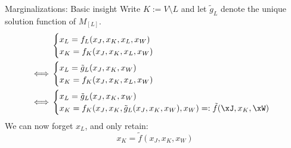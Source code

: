 \begin{frame}{Marginalizations: Basic insight}
  Write $K := V \setminus L$ and let $\tilde{g}_L$ denote the unique solution function of $M_{[L]}$.
    \begin{equation*}\begin{split}
  & \begin{cases}
    x_L = f_L(x_J,x_K,x_L,x_W) \\
    x_K = f_K(x_J,x_K,x_L,x_W) \\
  \end{cases} \\
  \iff & \begin{cases}
    x_L = \tilde{g}_L(x_J,x_K,x_W) \\
    x_K = f_K(x_J,x_K,x_L,x_W) \\
  \end{cases}  \\
  \iff & \begin{cases}
    x_L = \tilde{g}_L(x_J,x_K,x_W) \\
    x_K = f_K(x_J,x_K,\tilde{g}_L(x_J,x_K,x_W),x_W) =: \tilde{f}(\xJ,x_{K},\xW) \\
  \end{cases} \\
  \end{split}\end{equation*}
  We can now forget $x_L$, and only retain:
  $$x_K = \tilde{f}(x_J,x_K,x_W)$$
\end{frame}

